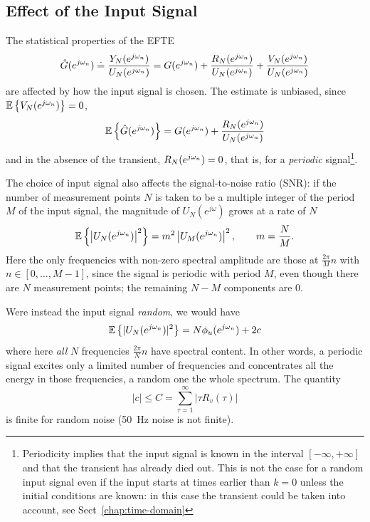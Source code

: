 \subsection{Effect of the Input Signal}
\label{sec:ETFE-statistical-properties}

The statistical properties of the EFTE
\begin{equation}
  \label{eq:freq-domain-LTI-estimator}
  \hat{G}(e^{j\omega_n}) \doteq \frac{Y_N(e^{j\omega_n})}{U_N(e^{j\omega_n})} = G(e^{j\omega_n}) + \frac{R_N(e^{j\omega_n})}{U_N(e^{j\omega_n})} + \frac{V_N(e^{j\omega_n})}{U_N(e^{j\omega_n})}
\end{equation}
are affected by how the input signal is chosen. The estimate is unbiased, since $\mathbb{E}\left\{V_N(e^{j\omega_n})\right\}=0$,
\begin{equation*}
  \mathbb{E}\left\{\hat{G}(e^{j\omega_n})\right\} = G(e^{j\omega_n}) + \frac{R_N(e^{j\omega_n})}{U_N(e^{j\omega_n})}
\end{equation*}
and in the absence of the transient, $R_N(e^{j\omega_n})=0$, that is, for a \emph{periodic} signal\footnote{Periodicity implies that the input signal is known in the interval $[-\infty,+\infty]$ and that the transient has already died out. This is not the case for a random input signal even if the input starts at times earlier than $k=0$ unless the initial conditions are known: in this case the transient could be taken into account, see Sect~\ref{chap:time-domain}}.

The choice of input signal also affects the signal-to-noise ratio (SNR): if the number of measurement points $N$ is taken to be a multiple integer of the period $M$ of the input signal, the magnitude of $U_N(e^{j\omega})$ grows at a rate of $N$
\begin{equation}
  \label{eq:PSD-periodic-input-signal}
  \mathbb{E}\left\{\left|U_N(e^{j\omega_n})\right|^2\right\} = m^2\left|U_M(e^{j\omega_n})\right|^2,\hspace{2em} m=\frac{N}{M}.
\end{equation}
Here the only frequencies with non-zero spectral amplitude are those at $\frac{2\pi}{M}n$ with $n\in [0,\ldots,M-1]$, since the signal is periodic with period $M$, even though there are $N$ measurement points; the remaining $N-M$ components are 0.

Were instead the input signal \emph{random}, we would have
\begin{equation}
  \label{eq:PSD-random-input-signal}
  \mathbb{E}\left\{|U_N(e^{j\omega_n})|^2\right\} = N\phi_u(e^{j\omega_n}) + 2c
\end{equation}
where here \emph{all} $N$ frequencies $\frac{2\pi}{N}n$ have spectral content. In other words, a periodic signal excites only a limited number of frequencies and concentrates all the energy in those frequencies, a random one the whole spectrum. The quantity
\begin{equation*}
  |c| \le C = \sum_{\tau=1}^\infty |\tau R_v(\tau)|
\end{equation*}
is finite for random noise (50~Hz noise is not finite).

